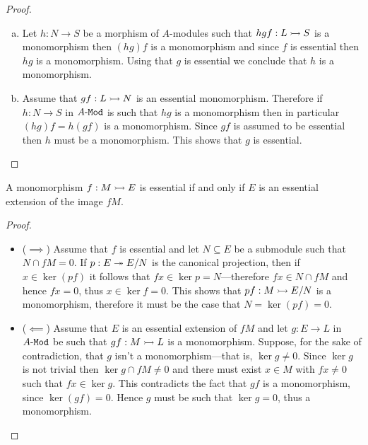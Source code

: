 \begin{proof}
\begin{enumerate}[(a)]\setlength\itemsep{0em}
\item Let \(h: N \to S\) be a morphism of \(A\)-modules such that
  \(h g f: L \rightarrowtail S\) is a monomorphism then \((h g) f\) is a monomorphism and
  since \(f\) is essential then \(h g\) is a monomorphism. Using that \(g\) is
  essential we conclude that \(h\) is a monomorphism.

\item Assume that \(g f: L \rightarrowtail N\) is an essential monomorphism. Therefore if
  \(h: N \to S\) in \({A\text{-}\texttt{Mod}}\) is such that \(h g\) is a monomorphism then in
  particular \((h g) f = h (g f)\) is a monomorphism. Since \(g f\) is assumed
  to be essential then \(h\) must be a monomorphism. This shows that \(g\) is
  essential.
\end{enumerate}
\end{proof}

\begin{proposition}
\label{prop:essential-iff--codomain-is-essential-extension-of-image}
A monomorphism \(f: M \rightarrowtail E\) is essential if and only if \(E\) is an
essential extension of the image \(f M\).
\end{proposition}

\begin{proof}
\begin{itemize}\setlength\itemsep{0em}
\item (\(\implies\)) Assume that \(f\) is essential and let \(N \subseteq E\) be a
  submodule such that \(N \cap f M = 0\). If \(p: E \twoheadrightarrow E/N\) is the canonical
  projection, then if \(x \in \ker(p f)\) it follows that
  \(f x \in \ker p = N\)---therefore \(f x \in N \cap f M\) and hence
  \(f x = 0\), thus \(x \in \ker f = 0\). This shows that \(p f: M \rightarrowtail E/N\) is
  a monomorphism, therefore it must be the case that \(N = \ker(p f) = 0\).

\item (\(\impliedby\)) Assume that \(E\) is an essential extension of \(f M\)
  and let \(g: E \to L\) in \({A\text{-}\texttt{Mod}}\) be such that \(g f: M \rightarrowtail L\) is a
  monomorphism. Suppose, for the sake of contradiction, that \(g\) isn't a
  monomorphism---that is, \(\ker g \neq 0\). Since \(\ker g\) is not trivial then
  \(\ker g \cap f M \neq 0\) and there must exist \(x \in M\) with
  \(f x \neq 0\) such that \(f x \in \ker g\). This contradicts the fact that
  \(g f\) is a monomorphism, since \(\ker(g f) = 0\). Hence \(g\) must be such
  that \(\ker g = 0\), thus a monomorphism.
\end{itemize}
\end{proof}


